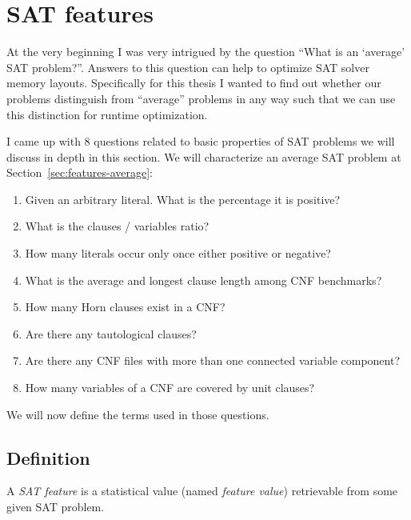 \renewcommand*\chappic{img/satfeatures.pdf}
\renewcommand*\chapquote{To be usable effectively [\dots] these features must be related to instance hardness and relatively cheap to compute}
\renewcommand*\chapquotesrc{SATzilla}
\chapter{SAT features}
\label{ch:features}
%
At the very beginning I was very intrigued by the question
\enquote{What is an \enquote{average} SAT problem?}. Answers to this
question can help to optimize SAT solver memory layouts.
Specifically for this thesis I wanted to find out whether
our problems distinguish from \enquote{average} problems in any
way such that we can use this distinction for runtime optimization.

I came up with 8 questions related to basic properties of SAT problems
we will discuss in depth in this section. We will characterize an
average SAT problem at Section~\ref{sec:features-average}:
\begin{enumerate}
\item Given an arbitrary literal. What is the percentage it is positive?
\item What is the clauses / variables ratio?
\item How many literals occur only once either positive or negative?
\item What is the average and longest clause length among CNF benchmarks?
\item How many Horn clauses exist in a CNF?
\item Are there any tautological clauses?
\item Are there any CNF files with more than one connected variable component?
\item How many variables of a CNF are covered by unit clauses?
\end{enumerate}

We will now define the terms used in those questions.

\section{Definition}
\label{sec:features-definition}
%
\begin{defi}
  A \emph{SAT feature} is a statistical value (named \emph{feature value})
  retrievable from some given SAT problem.
\end{defi}

